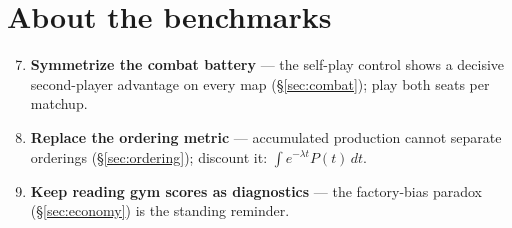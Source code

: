 \documentclass[11pt]{report}
\begin{document}
\section*{About the benchmarks}
\begin{enumerate}
  \setcounter{enumi}{6}
  \item \textbf{Symmetrize the combat battery} --- the self-play control
    shows a decisive second-player advantage on every map
    (\S\ref{sec:combat}); play both seats per matchup.
  \item \textbf{Replace the ordering metric} --- accumulated production
    cannot separate orderings (\S\ref{sec:ordering}); discount it:
    $\int e^{-\lambda t}P(t)\,dt$.
  \item \textbf{Keep reading gym scores as diagnostics} --- the
    factory-bias paradox (\S\ref{sec:economy}) is the standing reminder.
\end{enumerate}



\end{document}
